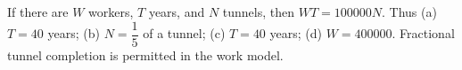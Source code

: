 If there are $W$ workers, $T$ years, and $N$ tunnels, then $WT=100000N$. Thus (a) $T=40$ years; (b) $N=\dfrac{1}{5}$ of a tunnel; (c) $T=40$ years; (d) $W=400000$. Fractional tunnel completion is permitted in the work model.
